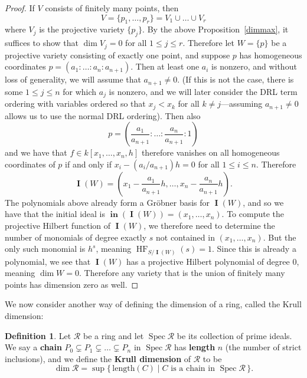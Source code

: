 \documentclass[11pt]{article}
\DeclareMathOperator{\Init}{\mathbf{in}}
\DeclareMathOperator{\Spec}{Spec}
\DeclareMathOperator{\HF}{HF}
\DeclareMathOperator{\I}{\mathbf{I}}
\theoremstyle{definition}
\newtheorem{definition}{Definition}
\begin{document}
\begin{proof}
	If $V$ consists of finitely many points, then \[ V = \{p_1, \dots, p_r\} = V_1 \cup \dots \cup V_r \] where $V_j$ is the projective variety $\{p_j\}$. By the above Proposition~\ref{dimmax}, it suffices to show that $\dim V_j = 0$ for all $1 \leq j \leq r$. Therefore let $W = \{p\}$ be a projective variety consisting of exactly one point, and suppose $p$ has homogeneous coordinates $p = (a_1: \dots: a_n: a_{n+1})$. Then at least one $a_i$ is nonzero, and without loss of generality, we will assume that $a_{n + 1} \neq 0$. (If this is not the case, there is some $1 \leq j \leq n$ for which $a_j$ is nonzero, and we will later consider the DRL term ordering with variables ordered so that $x_j < x_k$ for all $k \neq j$---assuming $a_{n + 1} \neq 0$ allows us to use the normal DRL ordering). Then also \[ p = \left( \frac{a_1}{a_{n+1}} : \dots : \frac{a_n}{a_{n+1}} : 1 \right) \] and we have that $f \in k[x_1, \dots, x_n, h]$ therefore vanishes on all homogeneous coordinates of $p$ if and only if $x_i - (a_i/a_{n+1})h = 0$ for all $1 \leq i \leq n$. Therefore \[ \I(W) = \left( x_1 - \frac{a_1}{a_{n+1}} h , \dots, x_n - \frac{a_n}{a_{n+1}}h \right). \] The polynomials above already form a Gröbner basis for $\I(W)$, and so we have that the initial ideal is $\Init(\I(W)) = (x_1, \dots, x_n)$. To compute the projective Hilbert function of $\I(W)$, we therefore need to determine the number of monomials of degree exactly $s$ not contained in $(x_1, \dots, x_n)$. But the only such monomial is $h^s$, meaning $\HF_{S/\I(W)}(s) = 1$. Since this is already a polynomial, we see that $\I(W)$ has a projective Hilbert polynomial of degree 0, meaning $\dim W = 0$. Therefore any variety that is the union of finitely many points has dimension zero as well. 
\end{proof}


We now consider another way of defining the dimension of a ring, called the Krull dimension:

\begin{definition}
	Let $\mathcal{R}$ be a ring and let $\Spec \mathcal{R}$ be its collection of prime ideals. We say a \textbf{chain} $P_0 \subsetneq P_1 \subsetneq \dots \subsetneq P_n$ in $\Spec \mathcal{R}$ has \textbf{length} $n$ (the number of strict inclusions), and we define the \textbf{Krull dimension} of $\mathcal{R}$ to be \[ \dim \mathcal{R} = \sup \{\,\text{length}(C) \mid C \text{ is a chain in } \Spec \mathcal{R}\,\}. \]
\end{definition}
\end{document}
